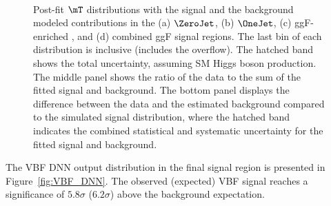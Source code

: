 \begin{figure}[htb]
  \centering
   \\
  \caption{
    Post-fit $\mT$ distributions with the signal and the background modeled contributions
    in the (a) $\ZeroJet$, (b) $\OneJet$, (c) ggF-enriched \TwoJet, and (d) combined ggF signal regions. The last bin of each distribution is inclusive (includes the overflow).
    The hatched band shows the total uncertainty, assuming SM Higgs boson production.
    The middle panel shows the ratio of the data to the sum of the fitted signal and background.
    The bottom panel displays the difference between the data and the estimated background compared to the simulated signal distribution, where the hatched band indicates the combined statistical and systematic uncertainty for the fitted signal and background.
    \label{fig:ggF_MT}
  }
\end{figure}


The VBF DNN output distribution in the final signal region is presented in Figure~\ref{fig:VBF_DNN}.
The observed (expected) VBF signal reaches a significance of $5.8\sigma$ ($6.2\sigma$) above the background expectation.



